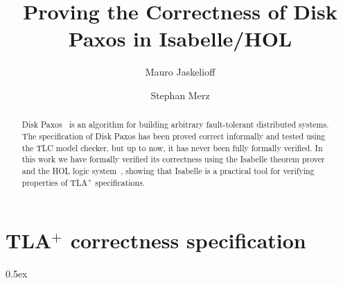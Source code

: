 \documentclass[11pt,a4paper]{article}
\begin{document}
\title{Proving the Correctness of Disk Paxos in Isabelle/HOL}
\author{Mauro Jaskelioff\and Stephan Merz}
\maketitle

\begin{abstract}
  Disk Paxos~\cite{Gafni00disk} is an algorithm for building arbitrary
  fault-tolerant distributed systems. The specification of Disk Paxos
  has been proved correct informally and tested using the TLC model
  checker, but up to now, it has never been fully formally verified.
  In this work we have formally verified its correctness using the
  Isabelle theorem prover and the HOL logic
  system~\cite{Nipkow-Paulson-Wenzel:2002}, showing that Isabelle is a
  practical tool for verifying properties of TLA$^{+}$ specifications.
\end{abstract}

\tableofcontents





\appendix

\section{TLA$^{+}$ correctness specification}
\label{ap:correctness}

\tla

\notla
\parindent 0pt\parskip 0.5ex


\end{document}
